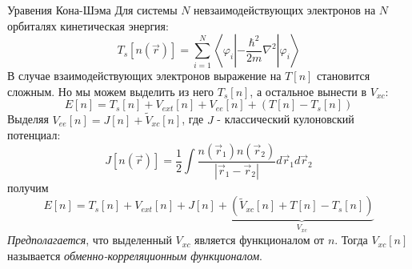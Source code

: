 \documentclass[t]{beamer}  %
\begin{document}
\begin{frame}[shrink=20]{Уравения Кона-Шэма}
    Для системы $N$ невзаимодействующих электронов на $N$ орбиталях кинетическая энергия:
    \begin{equation}
        T_s [n(\vec{r})] = \sum_{i=1}^{N} \left\langle\varphi_{i}\left|-\frac{\hbar^2}{2m} \nabla^{2}\right| \varphi_{i}\right\rangle
    \end{equation}
    В случае взаимодействующих электронов выражение на $T[n]$ становится сложным. Но мы можем выделить из него $T_s[n]$, а остальное вынести в $V_{xc}$:
    \begin{equation}
        E[n] = T_s[n] + V_{ext}[n] + V_{ee}[n] + (T[n] - T_s[n])
    \end{equation}
    Выделяя $V_{ee}[n] = J [n] + \tilde{V}_{xc} [n] $, где $J$ - классический кулоновский потенциал:
    \begin{equation}
        J[n(\vec{r})]=\frac{1}{2} \int \frac{n\left(\vec{r}_{1}\right) n\left(\vec{r}_{2}\right)}{\left|\vec{r}_{1}-\vec{r}_{2}\right|} d \vec{r}_{1} d \vec{r}_{2}
    \end{equation}
    получим 
    \begin{equation}
        \label{eq:to_variate_E}
        E[n]=T_s[n]+V_{ext}[n]+J[n]+\underbrace{(\tilde
        {V}_{xc}[n] + T[n] - T_s[n])}_{V_{xc}}
    \end{equation}
    \textit{Предполагается}, что выделенный $V_{xc}$ является функционалом от $n$.
    Тогда $V_{xc}[n]$ называется \textit{обменно-корреляционным функционалом}.

\end{frame}
\end{document}
